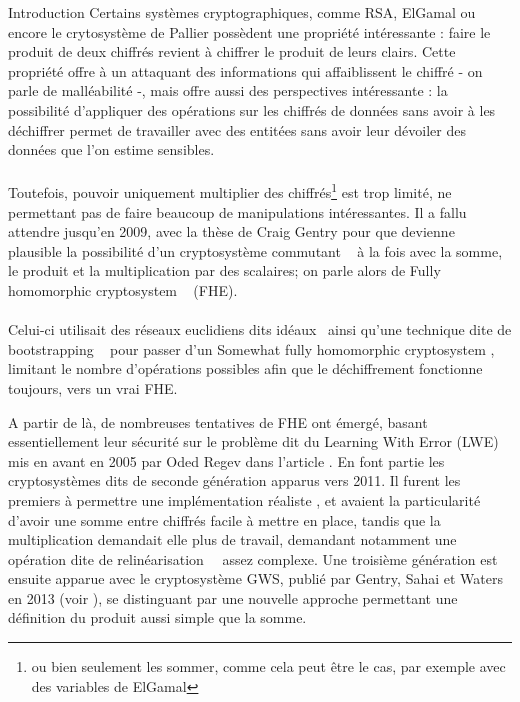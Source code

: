 \begin{section}{Introduction}
Certains systèmes cryptographiques, comme RSA, ElGamal ou encore le crytosystème de Pallier possèdent une
propriété intéressante : faire le produit de deux chiffrés revient à chiffrer le produit de leurs clairs. Cette
propriété offre à un attaquant des informations qui affaiblissent le chiffré - on parle de malléabilité -, mais
offre aussi des perspectives intéressante : la possibilité d'appliquer des opérations sur les chiffrés de
données sans avoir à les déchiffrer permet de travailler avec des entitées sans avoir leur dévoiler des données que l'on estime sensibles.
	\paragraph{}
	Toutefois, pouvoir uniquement multiplier des chiffrés\footnote{ou bien seulement les sommer, comme cela peut être le cas, par exemple avec des variables de ElGamal} est trop limité, ne permettant pas de faire beaucoup de manipulations intéressantes. Il a fallu attendre jusqu'en 2009, avec la thèse de Craig Gentry \cite{gentry_thesis} pour que devienne plausible la possibilité d'un cryptosystème \og commutant \fg~ à la fois avec la somme, le produit et la multiplication par des scalaires; on parle alors de \og Fully homomorphic cryptosystem \fg~ (FHE).

	\paragraph{}
	Celui-ci utilisait des réseaux euclidiens dits \og idéaux\fg~ ainsi qu'une technique dite de \og bootstrapping \fg~ pour passer d'un \og Somewhat fully homomorphic cryptosystem \fg, limitant le nombre d'opérations possibles afin que le déchiffrement fonctionne toujours, vers un vrai FHE.

A partir de là, de nombreuses tentatives de FHE ont émergé, basant essentiellement leur sécurité sur le problème
dit du Learning With Error (LWE) mis en avant en 2005 par Oded Regev dans l'article \cite{STOC:Regev05}.
En font partie les cryptosystèmes dits de seconde génération apparus vers 2011. 
Il furent les premiers à permettre une implémentation \og réaliste \fg, et avaient la particularité d'avoir une somme entre chiffrés facile à
mettre en place, tandis que la multiplication demandait elle plus de travail, demandant notamment une opération
dite de \og relinéarisation \fg~ assez complexe.  Une troisième génération est ensuite apparue avec le cryptosystème
GWS, publié  par Gentry, Sahai et Waters en 2013 (voir \cite{EPRINT:GenSahWat13}), se distinguant par 
une nouvelle approche permettant une définition du produit aussi simple que la somme.


\end{section}
